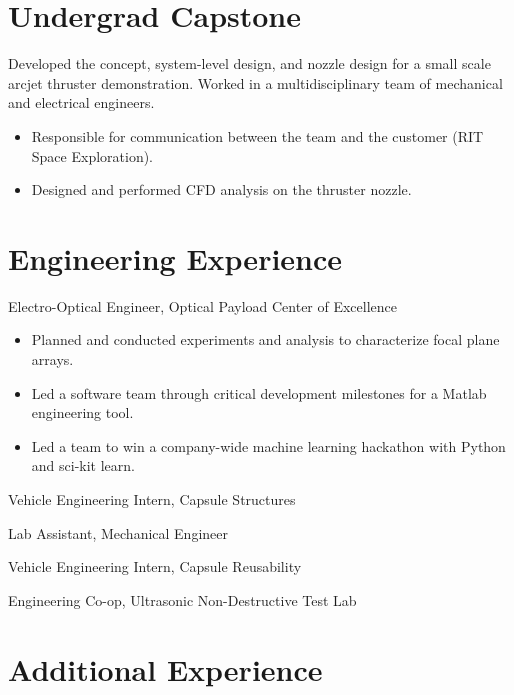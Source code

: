 \documentclass{resume}
\begin{document}
\section{Undergrad Capstone}
Developed the concept, system-level design, and nozzle design for a small scale
arcjet thruster demonstration. Worked in a multidisciplinary team of mechanical and electrical engineers.
\begin{itemize}
  \item Responsible for communication between the team and the customer (RIT Space Exploration).
  \item Designed and performed CFD analysis on the thruster nozzle.
\end{itemize}

\section{Engineering Experience}
Electro-Optical Engineer, Optical Payload Center of Excellence
\begin{itemize}
  \item Planned and conducted experiments and analysis to characterize focal plane arrays.
  \item Led a software team through critical development milestones for a Matlab engineering tool. 
  \item Led a team to win a company-wide machine learning hackathon with Python and sci-kit learn.
\end{itemize} 
Vehicle Engineering Intern, Capsule Structures

Lab Assistant, Mechanical Engineer

Vehicle Engineering Intern, Capsule Reusability

Engineering Co-op, Ultrasonic Non-Destructive Test Lab

\section{Additional Experience}
\end{document}
